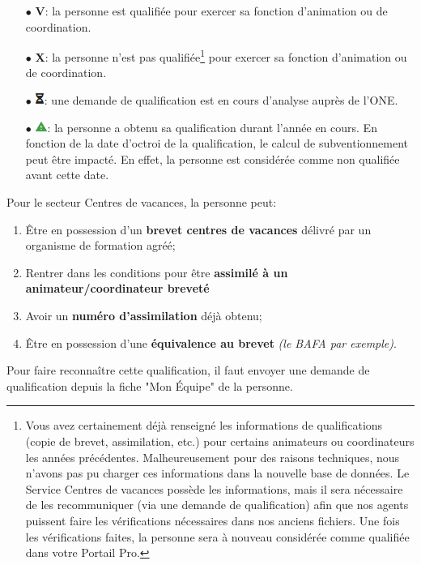 \begin{itemize}
    \item [$\bullet$]\textbf{\textcolor{bleu}{V}}: la personne est qualifiée pour exercer sa fonction d'animation ou de coordination. 
    \item [$\bullet$]\textbf{\textcolor{rouge}{X}}: la personne n'est pas qualifiée\footnote{Vous avez certainement déjà renseigné les informations de qualifications (copie de brevet, assimilation, etc.) pour certains animateurs ou coordinateurs les années précédentes. Malheureusement pour des raisons techniques, nous n'avons pas pu charger ces informations dans la nouvelle base de données. Le Service Centres de vacances possède les informations, mais il sera nécessaire de les recommuniquer (via une demande de qualification) afin que nos agents puissent faire les vérifications nécessaires dans nos anciens fichiers. Une fois les vérifications faites, la personne sera à nouveau considérée comme qualifiée dans votre Portail Pro.}  pour exercer sa fonction d'animation ou de coordination. 
    \item [$\bullet$]\includegraphics[width=0.3cm]{Images/icon/icon_sablier.png}: une demande de qualification est en cours d'analyse auprès de l'ONE. 
    \item [$\bullet$]\includegraphics[width=0.4cm]{Images/icon/icon_attention.png}: la personne a obtenu sa qualification durant l'année en cours. En fonction de la date d'octroi de la qualification, le calcul de subventionnement peut être impacté. En effet, la personne est considérée comme non qualifiée avant cette date. 
\end{itemize}
\vspace*{3mm}

\begin{tcolorbox}[title=Les quatre possibilités de qualification CDV]
Pour le secteur Centres de vacances, la personne peut: 

\begin{enumerate}
    \item Être en possession d'un \textbf{brevet centres de vacances} délivré par un organisme de formation agréé;
    \item Rentrer dans les conditions pour être \textbf{assimilé à un animateur/coordinateur breveté} 
    \item Avoir un \textbf{numéro d'assimilation} déjà obtenu; 
    \item Être en possession d'une \textbf{équivalence au brevet} \textit{(le BAFA par exemple)}.
\end{enumerate}
Pour faire reconnaître cette qualification, il faut envoyer une demande de qualification depuis la fiche "Mon Équipe" de la personne. 
\end{tcolorbox}

